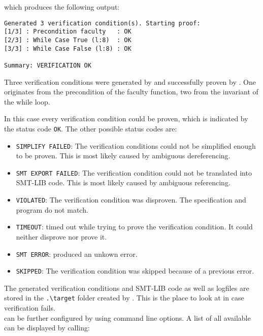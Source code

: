 \documentclass[12pt]{article}
\begin{document}
which produces the following output:

\vspace{0.5cm}

\begin{minipage}{\linewidth}
\begin{lstlisting}[style=cmd]
Generated 3 verification condition(s). Starting proof:
[1/3] : Precondition faculty   : OK
[2/3] : While Case True (l:8)  : OK
[3/3] : While Case False (l:8) : OK

Summary: VERIFICATION OK
\end{lstlisting}
\end{minipage}

Three verification conditions were generated by \verifyc and successfully proven by \zthree. 
One originates from the precondition of the faculty function, two from the invariant of the while loop.

In this case every verification condition could be proven, which is indicated by the status code \texttt{OK}.
The other possible status codes are:


\begin{itemize}
    \item \texttt{SIMPLIFY FAILED}: The verification conditions could not be simplified enough to be proven. This is most likely caused by ambiguous dereferencing.
    \item \texttt{SMT EXPORT FAILED}: The verification condition could not be translated into SMT-LIB code. This is most likely caused by ambiguous referencing.
    \item \texttt{VIOLATED}: The verification condition was disproven. The specification and program do not match.
    \item \texttt{TIMEOUT}: \zthree timed out while trying to prove the verification condition. It could neither disprove nor prove it.
    \item \texttt{SMT ERROR}: \zthree produced an unkown error.
    \item \texttt{SKIPPED}: The verification condition was skipped because of a previous error.
\end{itemize}

The generated verification conditions and SMT-LIB code as well as logfiles are stored in the \texttt{.\textbackslash target} folder created by \verifyc.
This is the place to look at in case verification fails.\\

\verifyc can be further configured by using command line options. 
A list of all available can be displayed by calling:
\end{document}
